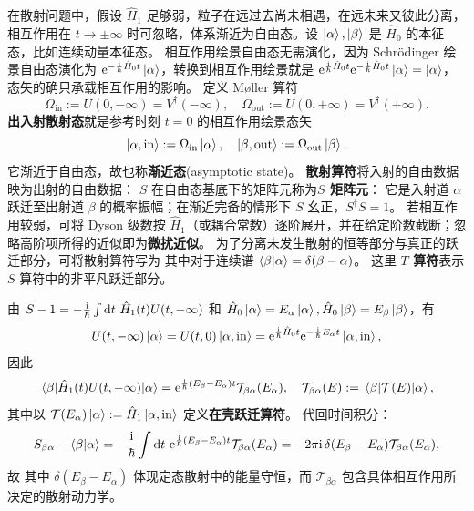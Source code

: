 在散射问题中，假设 $\hat H_1$ 足够弱，粒子在远过去尚未相遇，在远未来又彼此分离，相互作用在 $t\to\pm\infty$ 时可忽略，体系渐近为自由态。设 $\ket{\alpha},\ket{\beta}$ 是 $\hat H_0$ 的本征态，比如连续动量本征态。
相互作用绘景自由态无需演化，因为 Schr\"odinger 绘景自由态演化为 $\mathrm{e}^{-\frac{\mathrm{i}}{\hbar}\hat H_0 t}\ket{\alpha}$，转换到相互作用绘景就是 $\mathrm{e}^{\frac{\mathrm{i}}{\hbar}\hat H_0 t}\mathrm{e}^{-\frac{\mathrm{i}}{\hbar}\hat H_0 t}\ket{\alpha}=\ket{\alpha}$，态矢的确只承载相互作用的影响。
定义 M\o ller 算符
\[
    \Omega_{\mathrm{in}}
    :=U(0,-\infty)=V^\dagger(-\infty),\quad
    \Omega_{\mathrm{out}}
    :=U(0,+\infty)=V^\dagger(+\infty).
\]
\textbf{出入射散射态}就是参考时刻 $t=0$ 的相互作用绘景态矢
\[
    \ket{\alpha,\mathrm{in}}:=\Omega_{\mathrm{in}}\ket{\alpha},\quad
    \ket{\beta,\mathrm{out}}:=\Omega_{\mathrm{out}}\ket{\beta}.
\]
它渐近于自由态，故也称\textbf{渐近态}(asymptotic state)。
\textbf{散射算符}将入射的自由数据映为出射的自由数据：
$S$ 在自由态基底下的矩阵元称为\textbf{$S$ 矩阵元}：
它是入射道 $\alpha$ 跃迁至出射道 $\beta$ 的概率振幅；在渐近完备的情形下 $S$ 幺正，$S^\dagger S=1$。
若相互作用较弱，可将 Dyson 级数按 $\hat H_1$（或耦合常数）逐阶展开，并在给定阶数截断；忽略高阶项所得的近似即为\textbf{微扰近似}。
为了分离未发生散射的恒等部分与真正的跃迁部分，可将散射算符写为
其中对于连续谱 $\ip{\beta}{\alpha}=\delta(\beta-\alpha)$。
这里 \textbf{$T$ 算符}表示 $S$ 算符中的非平凡跃迁部分。

由 $S-1=-\frac{\mathrm{i}}{\hbar}\int\dd{t}\,\hat H_1(t)U(t,-\infty)$ 和 $\hat H_0\ket{\alpha}=E_\alpha\ket{\alpha},\hat H_0\ket{\beta}=E_\beta\ket{\beta}$，有
\[
U(t,-\infty)\ket{\alpha}=U(t,0)\ket{\alpha,\mathrm{in}}=\mathrm{e}^{\frac{\mathrm{i}}{\hbar}\hat H_0t}\mathrm{e}^{-\frac{\mathrm{i}}{\hbar}E_\alpha t}\ket{\alpha,\mathrm{in}},
\]
因此
\[
\mel{\beta}{\hat H_1(t)U(t,-\infty)}{\alpha}=
\mathrm{e}^{\frac{\mathrm{i}}{\hbar}(E_\beta-E_\alpha)t}
\mathcal T_{\beta\alpha}(E_\alpha),\quad
\mathcal T_{\beta\alpha}(E) := \mel{\beta}{\mathcal T(E)}{\alpha},
\]
其中以 $\mathcal T(E_\alpha)\ket{\alpha}:=\hat H_1\ket{\alpha,\mathrm{in}}$ 定义\textbf{在壳跃迁算符}。
代回时间积分：
\[
S_{\beta\alpha}-\ip{\beta}{\alpha}=
-\frac{\i}{\hbar}
\int\d{t}\,
\e^{\frac{\i}{\hbar}(E_\beta-E_\alpha)t}
\mathcal T_{\beta\alpha}(E_\alpha)=
-2\pi\i\,
\delta(E_\beta-E_\alpha)
\mathcal T_{\beta\alpha}(E_\alpha),
\]
故
其中 $\delta(E_\beta-E_\alpha)$ 体现定态散射中的能量守恒，而 $\mathcal T_{\beta\alpha}$ 包含具体相互作用所决定的散射动力学。

